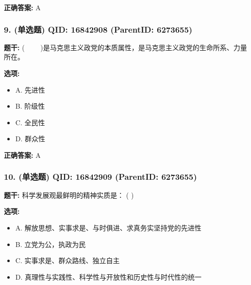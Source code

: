 \documentclass[12pt,UTF8]{ctexart}
\begin{document}
\textbf{正确答案:}
A

\vspace{0.3em}\hrulefill\vspace{0.7em}

\subsubsection*{9. (单选题) \small QID: 16842908 (ParentID: 6273655)}

\textbf{题干:}
(     )是马克思主义政党的本质属性，是马克思主义政党的生命所系、力量所在。



\textbf{选项:}
\begin{itemize}[leftmargin=*]

  \item A. 先进性

  \item B. 阶级性

  \item C. 全民性

  \item D. 群众性

\end{itemize}

\textbf{正确答案:}
A

\vspace{0.3em}\hrulefill\vspace{0.7em}

\subsubsection*{10. (单选题) \small QID: 16842909 (ParentID: 6273655)}

\textbf{题干:}
科学发展观最鲜明的精神实质是： ( )



\textbf{选项:}
\begin{itemize}[leftmargin=*]

  \item A. 解放思想、实事求是、与时俱进、求真务实坚持党的先进性

  \item B. 立党为公，执政为民

  \item C. 实事求是、群众路线、独立自主

  \item D. 真理性与实践性、科学性与开放性和历史性与时代性的统一

\end{itemize}
\end{document}
